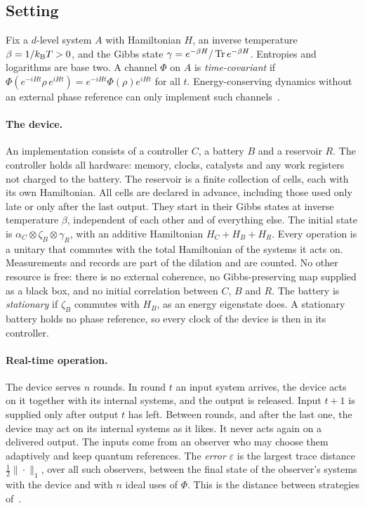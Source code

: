 \subsection{Setting}\label{sw:sec:setting}

Fix a $d$-level system $A$ with Hamiltonian $H$, an inverse temperature $\beta=1/k_{\mathrm B} T>0$, and the Gibbs state $\gamma=e^{-\beta H}/\operatorname{Tr} e^{-\beta H}$. Entropies and logarithms are base two. A channel $\Phi$ on $A$ is \emph{time-covariant} if $\Phi(e^{-iHt}\rho\, e^{iHt})=e^{-iHt}\Phi(\rho)e^{iHt}$ for all $t$. Energy-conserving dynamics without an external phase reference can only implement such channels~\cite{Lostaglio15,FBB21}.

\paragraph{The device.} An implementation consists of a controller $C$, a battery $B$ and a reservoir $R$. The controller holds all hardware: memory, clocks, catalysts and any work registers not charged to the battery. The reservoir is a finite collection of cells, each with its own Hamiltonian. All cells are declared in advance, including those used only late or only after the last output. They start in their Gibbs states at inverse temperature $\beta$, independent of each other and of everything else. The initial state is $\alpha_C\otimes\zeta_B\otimes\gamma_R$, with an additive Hamiltonian $H_C+H_B+H_R$. Every operation is a unitary that commutes with the total Hamiltonian of the systems it acts on. Measurements and records are part of the dilation and are counted. No other resource is free: there is no external coherence, no Gibbs-preserving map supplied as a black box, and no initial correlation between $C$, $B$ and $R$. The battery is \emph{stationary} if $\zeta_B$ commutes with $H_B$, as an energy eigenstate does. A stationary battery holds no phase reference, so every clock of the device is then in its controller.

\paragraph{Real-time operation.} The device serves $n$ rounds. In round $t$ an input system arrives, the device acts on it together with its internal systems, and the output is released. Input $t+1$ is supplied only after output $t$ has left. Between rounds, and after the last one, the device may act on its internal systems as it likes. It never acts again on a delivered output. The inputs come from an observer who may choose them adaptively and keep quantum references. The \emph{error} $\varepsilon$ is the largest trace distance $\tfrac12\|\cdot\|_1$, over all such observers, between the final state of the observer's systems with the device and with $n$ ideal uses of $\Phi$. This is the distance between strategies of~\cite{Chiribella08,GutoskiWatrous07}.

